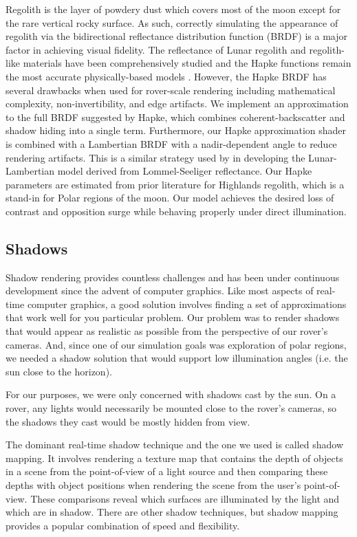 \documentclass[twocolumn,letterpaper]{IEEEAerospaceCLS}  %
\begin{document}
Regolith is the layer of powdery dust which covers most of the moon except for the rare vertical rocky surface. 
As such, correctly simulating the appearance of regolith via the bidirectional reflectance distribution function (BRDF) is a major factor in achieving visual fidelity. 
The reflectance of Lunar regolith and regolith-like materials have been comprehensively studied and the Hapke functions remain the most accurate physically-based models \cite{hapke11}. 
However, the Hapke BRDF has several drawbacks when used for rover-scale rendering including mathematical complexity, non-invertibility, and edge artifacts\cite{Wong2012}. 
We implement an approximation to the full BRDF suggested by Hapke, which combines coherent-backscatter and shadow hiding into a single term. 
Furthermore, our Hapke approximation shader is combined with a Lambertian BRDF with a nadir-dependent angle to reduce rendering artifacts. 
This is a similar strategy used by \cite{McEwen1996} in developing the Lunar-Lambertian model derived from Lommel-Seeliger reflectance. 
Our Hapke parameters are estimated from prior literature for Highlands regolith, which is a stand-in for Polar regions of the moon. 
Our model achieves the desired loss of contrast and opposition surge while behaving properly under direct illumination.           

\subsection{Shadows}
Shadow rendering provides countless challenges and has been under continuous development since the advent of computer graphics. 
Like most aspects of real-time computer graphics, a good solution involves finding a set of approximations that work well for you particular problem. 
Our problem was to render shadows that would appear as realistic as possible from the perspective of our rover's cameras. 
And, since one of our simulation goals was exploration of polar regions, we needed a shadow solution that would support low illumination angles (i.e. the sun close to the horizon).

For our purposes, we were only concerned with shadows cast by the sun. 
On a rover, any lights would necessarily be mounted close to the rover's cameras, so the shadows they cast would be mostly hidden from view.

The dominant real-time shadow technique and the one we used is called shadow mapping. 
It involves rendering a texture map that contains the depth of objects in a scene from the point-of-view of a light source and then comparing these depths with object positions when rendering the scene from the user's point-of-view. 
These comparisons reveal which surfaces are illuminated by the light and which are in shadow. 
There are other shadow techniques, but shadow mapping provides a popular combination of speed and flexibility.
\end{document}
